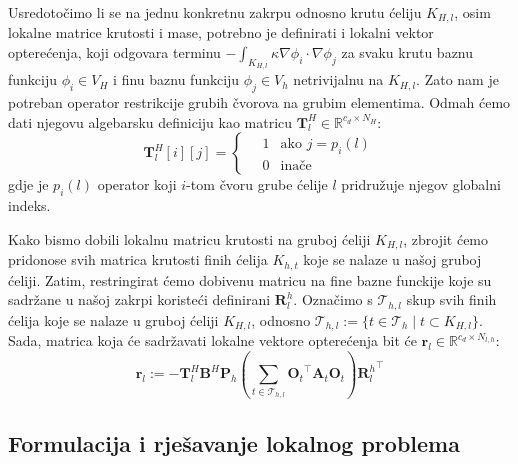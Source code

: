\documentclass[zavrsnirad]{fer}
\begin{document}
Usredotočimo li se na jednu konkretnu zakrpu odnosno krutu ćeliju $K_{H,l}$, osim lokalne matrice krutosti i mase,
potrebno je definirati i lokalni vektor opterećenja, koji odgovara terminu $-\int_{K_{H,l}}\kappa \nabla\phi_i \cdot \nabla\phi_j$
za svaku krutu baznu funkciju $\phi_i \in V_H$ i finu baznu funkciju $\phi_j \in V_h$ netrivijalnu na $K_{H,l}$.
Zato nam je potreban operator restrikcije grubih čvorova na grubim elementima. Odmah ćemo dati njegovu algebarsku definiciju
kao matricu $\mathbf{T}^H_l \in \mathbb{R}^{c_d \times N_H}$:
\begin{equation}
  \label{jed:coarse_node_in_coarse_element_restriction_matrix}
  \mathbf{T}^H_l[i][j] = \begin{cases}
    \quad 1 & \text{ako } j = p_i(l) \\
    \quad 0 & \text{inače}
  \end{cases}
\end{equation}
gdje je $p_i(l)$ operator koji $i$-tom čvoru grube ćelije $l$ pridružuje njegov globalni indeks.

Kako bismo dobili lokalnu matricu krutosti na gruboj ćeliji $K_{H,l}$, zbrojit ćemo pridonose svih matrica krutosti
finih ćelija $K_{h,t}$ koje se nalaze u našoj gruboj ćeliji. Zatim, restringirat ćemo dobivenu matricu na fine bazne
funckije koje su sadržane u našoj zakrpi koristeći definirani $\mathbf{R}^h_l$. Označimo s $\mathcal{T}_{h,l}$ skup
svih finih ćelija koje se nalaze u gruboj ćeliji $K_{H,l}$, odnosno $\mathcal{T}_{h,l} := \{t \in \mathcal{T}_h \mid t \subset K_{H,l}\}$.
Sada, matrica koja će sadržavati lokalne vektore opterećenja bit će $\mathbf{r}_l \in \mathbb{R}^{c_d \times N_{l,h}}$:
\begin{equation}
  \label{jed:local_load_vector}
  \mathbf{r}_l := -\mathbf{T}^H_l \mathbf{B}^H \mathbf{P}_h (\sum_{t \in \mathcal{T}_{h,l}} {\mathbf{O}_t}^\top \mathbf{A}_t \mathbf{O}_t) {\mathbf{R}^h_l}^\top
\end{equation}


\subsection{Formulacija i rješavanje lokalnog problema}
\end{document}
